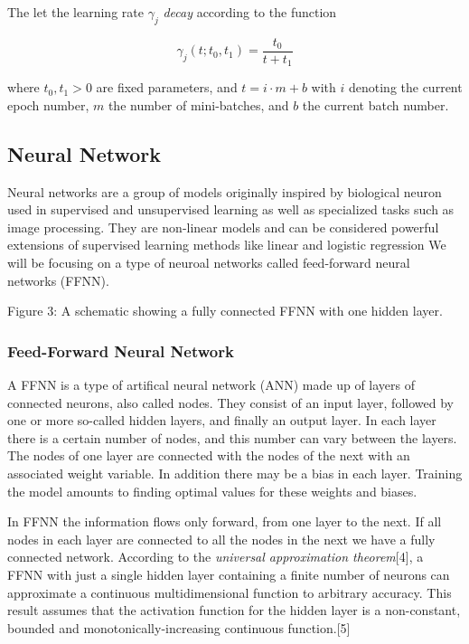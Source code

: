 \documentclass[11pt]{article}
\begin{document}
The let the learning rate \(\gamma_j\) \emph{decay} according to the
function

\[
\gamma_j(t; t_0, t_1) = \frac{t_0}{t+t_1} 
\]

where \(t_0, t_1 > 0\) are fixed parameters, and \(t=i \cdot m + b\)
with \(i\) denoting the current epoch number, \(m\) the number of
mini-batches, and \(b\) the current batch number.

    \hypertarget{neural-network}{%
\subsection{Neural Network}\label{neural-network}}

Neural networks are a group of models originally inspired by biological
neuron used in supervised and unsupervised learning as well as
specialized tasks such as image processing. They are non-linear models
and can be considered powerful extensions of supervised learning methods
like linear and logistic regression We will be focusing on a type of
neuroal networks called feed-forward neural networks (FFNN).

    Figure 3: A schematic showing a fully connected FFNN with one hidden
layer.

    \hypertarget{feed-forward-neural-network}{%
\subsubsection{Feed-Forward Neural
Network}\label{feed-forward-neural-network}}

A FFNN is a type of artifical neural network (ANN) made up of layers of
connected neurons, also called nodes. They consist of an input layer,
followed by one or more so-called hidden layers, and finally an output
layer. In each layer there is a certain number of nodes, and this number
can vary between the layers. The nodes of one layer are connected with
the nodes of the next with an associated weight variable. In addition
there may be a bias in each layer. Training the model amounts to finding
optimal values for these weights and biases.

In FFNN the information flows only forward, from one layer to the next.
If all nodes in each layer are connected to all the nodes in the next we
have a fully connected network. According to the \emph{universal
approximation theorem}{[}4{]}, a FFNN with just a single hidden layer
containing a finite number of neurons can approximate a continuous
multidimensional function to arbitrary accuracy. This result assumes
that the activation function for the hidden layer is a non-constant,
bounded and monotonically-increasing continuous function.{[}5{]}
\end{document}
